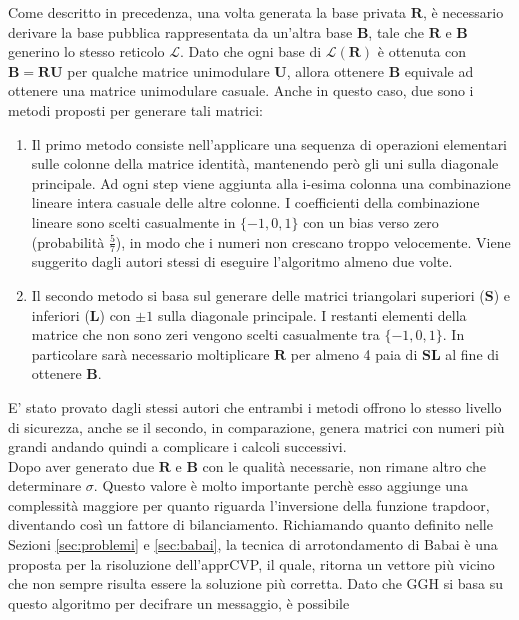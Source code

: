 Come descritto in precedenza, una volta generata la base privata $\mathbf{R}$, è necessario 
derivare la base pubblica rappresentata da un'altra base $\mathbf{B}$, tale che $\mathbf{R}$ 
e $\mathbf{B}$ generino lo stesso reticolo $\mathcal{L}$. Dato che ogni base di 
$\mathcal{L}(\mathbf{R})$ è ottenuta con $\mathbf{B} = \mathbf{R}\mathbf{U}$ per qualche matrice
unimodulare $\mathbf{U}$, allora ottenere $\mathbf{B}$ equivale ad ottenere una matrice
unimodulare casuale. Anche in questo caso, due sono i metodi proposti per generare tali matrici:
\begin{enumerate}
    \item Il primo metodo consiste nell'applicare una sequenza di operazioni elementari 
    sulle colonne della matrice identità, mantenendo però gli uni sulla diagonale principale.
    Ad ogni step viene aggiunta alla i-esima colonna una combinazione lineare intera casuale
    delle altre colonne. I coefficienti della combinazione lineare sono scelti casualmente
    in $\{-1,0,1\}$ con un bias verso zero (probabilità $\frac{5}{7}$), in modo che i numeri non
    crescano troppo velocemente. Viene suggerito dagli autori stessi di eseguire l'algoritmo
    almeno due volte.
    \item Il secondo metodo si basa sul generare delle matrici triangolari superiori 
    ($\mathbf{S}$) e inferiori ($\mathbf{L}$) con $\pm1$ sulla diagonale principale. I 
    restanti elementi della matrice che non sono zeri vengono scelti casualmente tra
    $\{-1,0,1\}$. In particolare sarà necessario moltiplicare $\mathbf{R}$ per almeno 4
    paia di $\mathbf{S}\mathbf{L}$ al fine di ottenere $\mathbf{B}$.
\end{enumerate}
E' stato provato dagli stessi autori che entrambi i metodi offrono lo stesso livello di sicurezza,
anche se il secondo, in comparazione, genera matrici con numeri più grandi andando quindi a 
complicare i calcoli successivi. \\
Dopo aver generato due $\mathbf{R}$ e $\mathbf{B}$ con le qualità necessarie, non
rimane altro che determinare $\sigma$. Questo valore è molto importante perchè esso aggiunge
una complessità maggiore per quanto riguarda l'inversione della funzione trapdoor, diventando
così un fattore di bilanciamento. Richiamando quanto definito nelle Sezioni \ref{sec:problemi}
e \ref{sec:babai}, la tecnica di arrotondamento di Babai è una proposta per la risoluzione 
dell'apprCVP, il quale, ritorna un vettore più vicino che non sempre risulta essere la soluzione più
corretta. Dato che GGH si basa su questo algoritmo per decifrare un messaggio, è possibile
